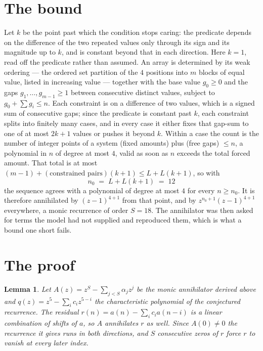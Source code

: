 \documentclass[11pt,a4paper]{article}
\theoremstyle{plain}
\newtheorem{lemma}[theorem]{Lemma}
\theoremstyle{definition}
\begin{document}
\section{The bound}

Let $k$ be the point past which the condition stops caring: the predicate depends on the
difference of the two repeated values only through its sign and its magnitude up to $k$, and is
constant beyond that in each direction. Here $k=1$, read off the predicate rather than
assumed. An array is determined by its weak ordering --- the ordered set partition of the
$4$ positions into $m$ blocks of equal value, listed in increasing value --- together with
the base value $g_0\ge0$ and the gaps $g_1,\dots,g_{m-1}\ge1$ between consecutive distinct
values, subject to $g_0+\sum g_i\le n$. Each constraint is on a difference of two values, which
is a signed sum of consecutive gaps; since the predicate is constant past $k$, each constraint
splits into finitely many cases, and in every case it either fixes that gap-sum to one of at
most $2k+1$ values or pushes it beyond $k$. Within a case the count is the number of integer
points of a system (fixed amounts) plus (free gaps) $\le n$, a polynomial in $n$ of degree at
most $4$, valid as soon as $n$ exceeds the total forced amount. That total is at most
$(m-1)+(\text{constrained pairs})(k+1)\le L+L(k+1)$, so with
\[
n_0 \;=\; L + L(k+1) \;=\; 12
\]
the sequence agrees with a polynomial of degree at most $4$ for every $n\ge n_0$. It is
therefore annihilated by $(z-1)^{4+1}$ from that point, and by $z^{n_0+1}(z-1)^{4+1}$
everywhere, a monic recurrence of order $S=18$. The annihilator was then asked for terms the
model had not supplied and reproduced them, which is what a bound one short fails.

\section{The proof}

\begin{lemma}\label{lem:crit}
Let $A(z)=z^S-\sum_{j<S}\alpha_jz^{j}$ be the monic annihilator derived above and
$q(z)=z^{5}-\sum_ic_iz^{5-i}$ the characteristic polynomial of the conjectured
recurrence. The residual $r(n)=a(n)-\sum_ic_ia(n-i)$ is a linear combination of shifts of $a$,
so $A$ annihilates $r$ as well. Since $A(0)\ne0$ the recurrence it gives runs in both
directions, and $S$ consecutive zeros of $r$ force $r$ to vanish at every later index.
\end{lemma}
\end{document}

